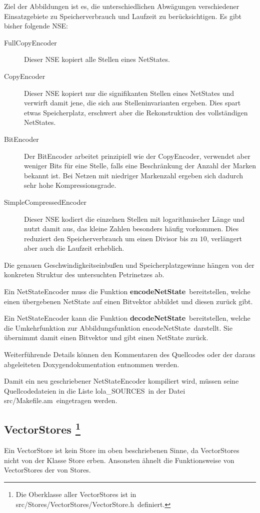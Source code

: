 \documentclass[12pt,a4paper,titlepage]{scrartcl}
\renewcommand \( {\left (}
\renewcommand \) {\right )}
\renewcommand \[ {\left [}
\renewcommand \] {\right ]}
\newcommand \Flqq {\flqq\ }
\begin{document}
Ziel der Abbildungen ist es, die unterschiedlichen Abwägungen verschiedener Einsatzgebiete zu Speicherverbrauch und Laufzeit zu berücksichtigen. Es gibt bisher folgende NSE:
\begin{description}
\item[FullCopyEncoder] Dieser NSE kopiert alle Stellen eines NetStates.
\item[CopyEncoder] Dieser NSE kopiert nur die signifikanten Stellen eines NetStates und verwirft damit jene, die sich aus Stelleninvarianten ergeben. Dies spart etwas Speicherplatz, erschwert aber die Rekonstruktion des vollständigen NetStates.
\item[BitEncoder] Der BitEncoder arbeitet prinzipiell wie der CopyEncoder, verwendet aber weniger Bits für eine Stelle, falls eine Beschränkung der Anzahl der Marken bekannt ist. Bei Netzen mit niedriger Markenzahl ergeben sich dadurch sehr hohe Kompressionsgrade.
\item[SimpleCompressedEncoder] Dieser NSE kodiert die einzelnen Stellen mit logarithmischer Länge und nutzt damit aus, das kleine Zahlen besonders häufig vorkommen. Dies reduziert den Speicherverbrauch um einen Divisor bis zu $10$, verlängert aber auch die Laufzeit erheblich.
\end{description}
Die genauen Geschwindigkeitseinbußen und Speicherplatzgewinne hängen von der konkreten Struktur des untersuchten Petrinetzes ab.

Ein NetStateEncoder muss die Funktion \frqq\textbf{encodeNetState}\Flqq bereitstellen, welche einen übergebenen NetState auf einen Bitvektor abbildet und diesen zurück gibt.

Ein NetStateEncoder kann die Funktion \frqq\textbf{decodeNetState}\Flqq bereitstellen, welche die Umkehrfunktion zur Abbildungsfunktion \frqq encodeNetState\Flqq darstellt. Sie übernimmt damit einen Bitvektor und gibt einen NetState zurück.

Weiterführende Details können den Kommentaren des Quellcodes oder der daraus abgeleiteten Doxygendokumentation entnommen werden.

Damit ein neu geschriebener NetStateEncoder kompiliert wird, müssen seine Quellcodedateien in die Liste \frqq lola\_SOURCES\Flqq in der Datei \frqq src/Makefile.am\Flqq eingetragen werden.

\subsection{VectorStores
\protect\footnote{Die Oberklasse aller VectorStores ist in \frqq src/Stores/VectorStores/VectorStore.h\Flqq definiert.}}
\label{kap:VectorStores}
Ein VectorStore ist kein Store im oben beschriebenen Sinne, da VectorStores nicht von der Klasse Store erben. Ansonsten ähnelt die Funktionsweise von VectorStores der von Stores.
\end{document}
